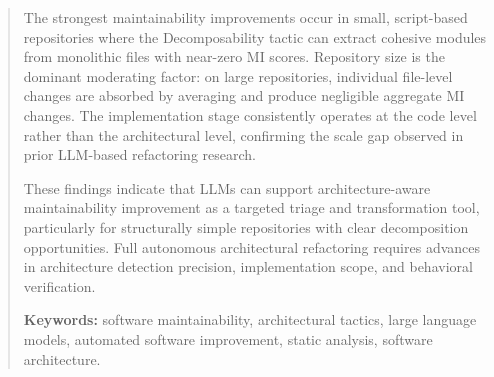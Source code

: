 \begin{abstract}
The strongest maintainability improvements occur in small, script-based repositories where the Decomposability tactic can extract cohesive modules from monolithic files with near-zero MI scores. Repository size is the dominant moderating factor: on large repositories, individual file-level changes are absorbed by averaging and produce negligible aggregate MI changes. The implementation stage consistently operates at the code level rather than the architectural level, confirming the scale gap observed in prior LLM-based refactoring research.

These findings indicate that LLMs can support architecture-aware maintainability improvement as a targeted triage and transformation tool, particularly for structurally simple repositories with clear decomposition opportunities. Full autonomous architectural refactoring requires advances in architecture detection precision, implementation scope, and behavioral verification.

\vspace{1em}
\noindent
\textbf{Keywords:} software maintainability, architectural tactics, large language models, automated software improvement, static analysis, software architecture.
\end{abstract}
